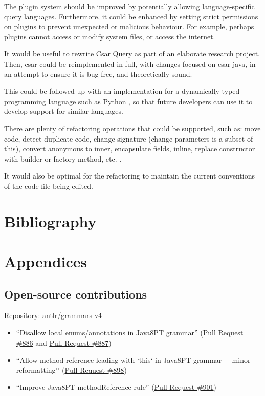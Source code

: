 \documentclass[12pt, letterpaper]{article}
\begin{document}
The plugin system should be improved by potentially allowing language-specific query languages.
Furthermore, it could be enhanced by setting strict permissions on plugins to prevent unexpected or malicious behaviour.
For example, perhaps plugins cannot access or modify system files, or access the internet.

It would be useful to rewrite Csar Query as part of an elaborate research project.
Then, csar could be reimplemented in full, with changes focused on csar-java, in an attempt to ensure it is bug-free, and theoretically sound.

This could be followed up with an implementation for a dynamically-typed programming language such as Python \autocite{learningpython5thed}, so that future developers can use it to develop support for similar languages.

There are plenty of refactoring operations that could be supported, such as: move code, detect duplicate code, change signature (change parameters is a subset of this), convert anonymous to inner, encapsulate fields, inline, replace constructor with builder or factory method, etc. \autocite{intellijidearefactoring}.

It would also be optimal for the refactoring to maintain the current conventions of the code file being edited.

\section{Bibliography}
\printbibliography[heading=none]

\section{Appendices}

\subsection{Open-source contributions}
\label{apx:OpenSourceContributions}
Repository: \href{https://github.com/antlr/grammars-v4}{antlr/grammars-v4}
\begin{itemize}
  \item ``Disallow local enums/annotations in Java8PT grammar'' (\href{https://github.com/antlr/grammars-v4/pull/886}{Pull Request \#886} and \href{https://github.com/antlr/grammars-v4/pull/887}{Pull Request \#887})
  \item ``Allow method reference leading with `this` in Java8PT grammar + minor reformatting'' (\href{https://github.com/antlr/grammars-v4/pull/898}{Pull Request \#898})
  \item ``Improve Java8PT methodReference rule'' (\href{https://github.com/antlr/grammars-v4/pull/901}{Pull Request \#901})
\end{itemize}
\end{document}
